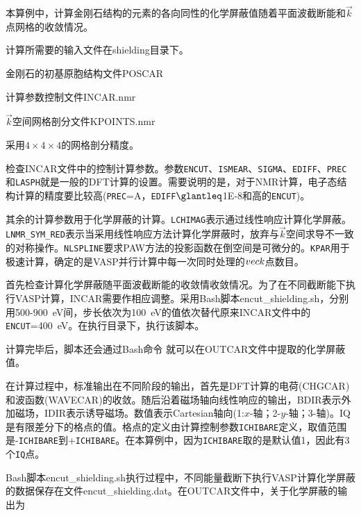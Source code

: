 本算例中，计算金刚石结构的元素的各向同性的化学屏蔽值随着平面波截断能和$\vec k$点网格的收敛情况。

计算所需要的输入文件在\textrm{shielding}目录下。

金刚石的初基原胞结构文件\textrm{POSCAR}

计算参数控制文件\textrm{INCAR.nmr}

$\vec k$空间网格剖分文件\textrm{KPOINTS.nmr}

采用$4\times4\times4$的网格剖分精度。

检查\textrm{INCAR}文件中的控制计算参数。参数\texttt{ENCUT}、\texttt{ISMEAR}、\texttt{SIGMA}、\texttt{EDIFF}、\texttt{PREC}和\texttt{LASPH}就是一般的\textrm{DFT}计算的设置。需要说明的是，对于\textrm{NMR}计算，电子态结构计算的精度要比较高(\texttt{PREC}=\textrm{A}，\texttt{EDIFF}$\glantleq$1E-8和高的\texttt{ENCUT})。

其余的计算参数用于化学屏蔽的计算。\texttt{LCHIMAG}表示通过线性响应计算化学屏蔽。\texttt{LNMR\_SYM\_RED}表示当采用线性响应方法计算化学屏蔽时，放弃与$\vec k$空间求导不一致的对称操作。\texttt{NLSPLINE}要求\textrm{PAW}方法的投影函数在倒空间是可微分的。\texttt{KPAR}用于极速计算，确定的是\textrm{VASP}并行计算中每一次同时处理的$\\vec k$点数目。

首先检查计算化学屏蔽随平面波截断能的收敛情收敛情况。为了在不同截断能下执行\textrm{VASP}计算，\textrm{INCAR}需要作相应调整。采用\textrm{Bash}脚本\textrm{encut\_shielding.sh}，分别用\textrm{500-900~eV}间，步长依次为\textrm{100~eV}的值依次替代原来\textrm{INCAR}文件中的\texttt{ENCUT}=\textrm{400~eV}。在执行目录下，执行该脚本。

计算完毕后，脚本还会通过\textrm{Bash}命令
就可以在\textrm{OUTCAR}文件中提取的化学屏蔽值。

在计算过程中，标准输出在不同阶段的输出，首先是\textrm{DFT}计算的电荷\textrm{(CHGCAR)}和波函数\textrm{(WAVECAR)}的收敛。随后沿着磁场轴向线性响应的输出，\textsc{BDIR}表示外加磁场，\textsc{IDIR}表示诱导磁场。数值表示\textrm{Cartesian}轴向(1:$x$-轴；2-$y$-轴；$3$-轴)。\textsc{IQ}是有限差分下的格点的值。格点的定义由计算控制参数\texttt{ICHIBARE}定义，取值范围是-\texttt{ICHIBARE}到+\texttt{ICHIBARE}。在本算例中，因为\texttt{ICHIBARE}取的是默认值1，因此有3个\texttt{IQ}点。

\textrm{Bash}脚本\textrm{encut\_shielding.sh}执行过程中，不同能量截断下执行\textrm{VASP}计算化学屏蔽的数据保存在文件\textrm{encut\_shielding.dat}。在\textrm{OUTCAR}文件中，关于化学屏蔽的输出为

